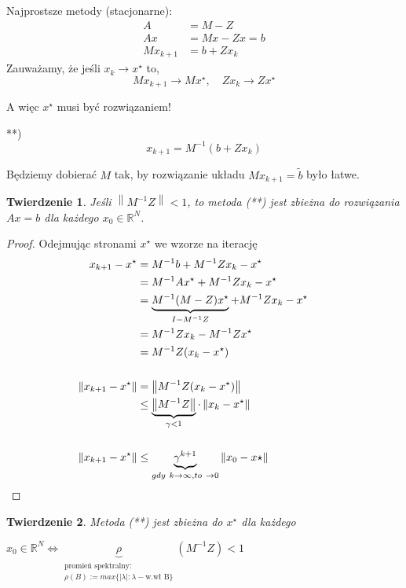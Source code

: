 \documentclass[hidelinks,a4paper,fleqn,oneside]{book}
\newcommand{\RR}{\mathbb{R}}
\newcommand{\ra}{\rightarrow}
\newcommand{\eye}{I}
\newcommand{\norm}[1]{\left\lVert#1\right\rVert}
\newtheorem{twierdz}{Twierdzenie}
\begin{document}
Najprostsze metody (stacjonarne):
\begin{align*}
	A & = M - Z \\
	Ax & = Mx - Zx = b\\
	Mx_{k+1} & = b + Zx_k 
\end{align*}
Zauważamy, że jeśli $x_k \ra x^\star$ to,
\[
	Mx_{k+1} \ra Mx^\star,\quad Zx_k \ra Zx^\star
\]

A więc $x^\star$ musi być rozwiązaniem!

**)
\[
	x_{k+1} = M^{-1}(b + Zx_k)
\]

Będziemy dobierać $M$ tak, by rozwiązanie układu $Mx_{k+1} = \tilde{b}$ było łatwe.

\begin{twierdz}
	Jeśli $\norm{M^{-1}Z} < 1$, to metoda (**) jest zbieżna do rozwiązania $Ax = b$ dla każdego $x_0 \in \RR^N$.
\end{twierdz}


\begin{proof}
  Odejmując stronami $x^\star$ we wzorze na iterację
  \begin{align*}
	x_{k+1} - x^\star & = M^{-1}b + M^{-1}Zx_k - x^\star \\
		& = M^{-1}Ax^\star + M^{-1}Zx_k - x^\star \\
		& = \underbrace{M^{-1}(M-Z)x^\star}_{\eye - M^{-1}Z} + M^{-1}Zx_k - x^\star \\
		& = M^{-1}Zx_k - M^{-1}Zx^\star\\
		& = M^{-1}Z(x_k - x^\star) \\ \\
		\norm{x_{k+1} - x^\star} & = \norm{M^{-1}Z(x_k - x^\star)} \\
		& \leq \underbrace{\norm{M^{-1}Z}}_{\gamma < 1} \cdot \norm{x_k - x^\star} \\ \\
		\norm{x_{k+1} - x^\star} & \leq \underbrace{\gamma^{k+1}}_{gdy\ k \ra \infty, to\ \ra 0} \norm{x_0 - x\star}
		 && \qedhere
  \end{align*}
\end{proof}
	
\begin{twierdz}
	Metoda (**) jest zbieżna do $x^\star$ dla każdego

    $x_0 \in \RR^N \iff \underbrace{\rho}_{\substack{\textrm{promień spektralny: }\\ \rho(B) := max\{| \lambda|: \lambda - \textrm{w.wł B}\}}}(M^{-1}Z) < 1$
\end{twierdz}
\end{document}
